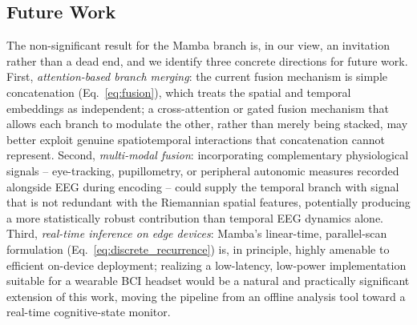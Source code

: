 \documentclass[journal]{IEEEtran}
\begin{document}
\subsection{Future Work}
\label{sec:future_work}
The non-significant result for the Mamba branch is, in our view, an invitation rather than a dead end, and we identify three concrete directions for future work. First, \emph{attention-based branch merging}: the current fusion mechanism is simple concatenation (Eq.~\eqref{eq:fusion}), which treats the spatial and temporal embeddings as independent; a cross-attention or gated fusion mechanism that allows each branch to modulate the other, rather than merely being stacked, may better exploit genuine spatiotemporal interactions that concatenation cannot represent. Second, \emph{multi-modal fusion}: incorporating complementary physiological signals -- eye-tracking, pupillometry, or peripheral autonomic measures recorded alongside EEG during encoding -- could supply the temporal branch with signal that is not redundant with the Riemannian spatial features, potentially producing a more statistically robust contribution than temporal EEG dynamics alone. Third, \emph{real-time inference on edge devices}: Mamba's linear-time, parallel-scan formulation (Eq.~\eqref{eq:discrete_recurrence}) is, in principle, highly amenable to efficient on-device deployment; realizing a low-latency, low-power implementation suitable for a wearable BCI headset would be a natural and practically significant extension of this work, moving the pipeline from an offline analysis tool toward a real-time cognitive-state monitor.



\end{document}
